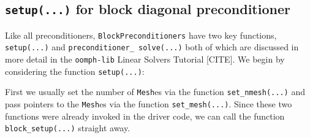 \subsection{\texttt{setup(...)} for block diagonal preconditioner\label{sec:block_diagonal_preconditioner_setup}}

Like all preconditioners, \texttt{Block\allowbreak Preconditioners} have two
key functions, \texttt{setup(...)} and \texttt{preconditioner\_\allowbreak
  solve(...)} both of which are discussed in more detail in the
\texttt{oomph-\allowbreak lib} Linear Solvers Tutorial [CITE]. We begin by
considering the function \texttt{setup(...)}:
 
First we usually set the number of \texttt{Mesh}es via the function
\texttt{set\_\allowbreak nmesh(...)} and pass pointers to the \texttt{Mesh}es
via the function \texttt{set\_\allowbreak mesh(...)}. Since these two functions
were already invoked in the driver code, we can call the function
\texttt{block\_\allowbreak setup(...)} straight away.
